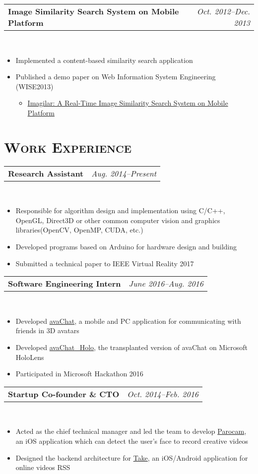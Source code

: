 \documentclass[11pt,a4paper,roman]{moderncv}        %
\makeatletter
\newcommand{\cvexpr}[5][1em]{
  \begin{tabular*}{\maincolumnwidth}{l@{\extracolsep{\fill}}r}%
    {\textbf{#3}\ifthenelse{\equal{#4}{}}{}{, #4}} & {\small\itshape#2}%
  \end{tabular*}%
  \\
  \begin{minipage}{\maincolumnwidth}%
        #5%
  \end{minipage}%
  \par\addvspace{#1}
}
\makeatother
\begin{document}
\cvexpr{Oct. 2012--Dec. 2013}{Image Similarity Search System on Mobile Platform}{University of Queensland}{
\begin{itemize}
\item Implemented a content-based similarity search application
\item Published a demo paper on Web Information System Engineering (WISE2013)
\begin{itemize}
\item \href{http://link.springer.com/chapter/10.1007\%2F978-3-642-41154-0_47}{Imagilar: A Real-Time Image Similarity Search System on Mobile Platform}
\end{itemize}
\end{itemize}
}

\section{\scshape Work Experience}
\cvexpr{Aug. 2014--Present}{Research Assistant}{School of Software, Tsinghua University}{
\begin{itemize}
\item Responsible for algorithm design and implementation using C/C++, OpenGL, Direct3D or other common computer vision and graphics libraries(OpenCV, OpenMP, CUDA, etc.)
\item Developed programs based on Arduino for hardware design and building
\item Submitted a technical paper to IEEE Virtual Reality 2017
\end{itemize}
}

\cvexpr{June 2016--Aug. 2016}{Software Engineering Intern}{Windows and Devices Group, Microsoft}{
\begin{itemize}
\item Developed \href{http://bichengluo.me/\#avaChat}{avaChat}, a mobile and PC application for communicating with friends in 3D avatars
\item Developed \href{http://bichengluo.me/\#avaChat}{avaChat\_Holo}, the transplanted version of avaChat on Microsoft HoloLens
\item Participated in Microsoft Hackathon 2016
\end{itemize}
}

\cvexpr{Oct. 2014--Feb. 2016}{Startup Co-founder \& CTO}{Leezee Co., Ltd.}{
\begin{itemize}
\item Acted as the chief technical manager and led the team to develop \href{https://itunes.apple.com/us/app/parocam-funniest-camera-ever/id971725907}{Parocam}, an iOS application which can detect the user's face to record creative videos
\item Designed the backend architecture for \href{http://www.takevideo.cn/}{Take}, an iOS/Android application for online videos RSS
\end{itemize}
}
\end{document}
